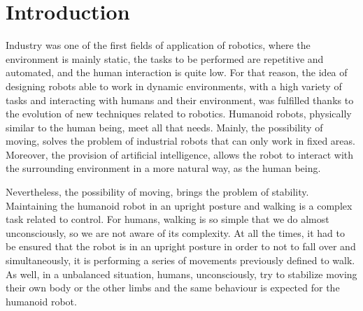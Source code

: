 \chapter{Introduction}
Industry was one of the first fields of application of robotics, where the environment is mainly static, the tasks to be performed are repetitive and automated, and the human interaction is quite low. For that reason, the idea of designing robots able to work in dynamic environments, with a high variety of tasks and interacting with humans and their environment, was fulfilled thanks to the evolution of new techniques related to robotics. Humanoid robots, physically similar to the human being, meet all that needs. Mainly, the possibility of moving, solves the problem of industrial robots that can only work in fixed areas. Moreover, the provision of artificial intelligence, allows the robot to interact with the surrounding environment in a more natural way, as the human being.

Nevertheless, the possibility of moving, brings the problem of stability. Maintaining the humanoid robot in an upright posture and walking is a complex task related to control. For humans, walking is so simple that we do almost unconsciously, so we are not aware of its complexity. At all the times, it had to be ensured that the robot is in an upright posture in order to not to fall over and simultaneously, it is performing a series of movements previously defined to walk. As well, in a unbalanced situation, humans, unconsciously, try to stabilize moving their own body or the other limbs and the same behaviour is expected for the humanoid robot.

